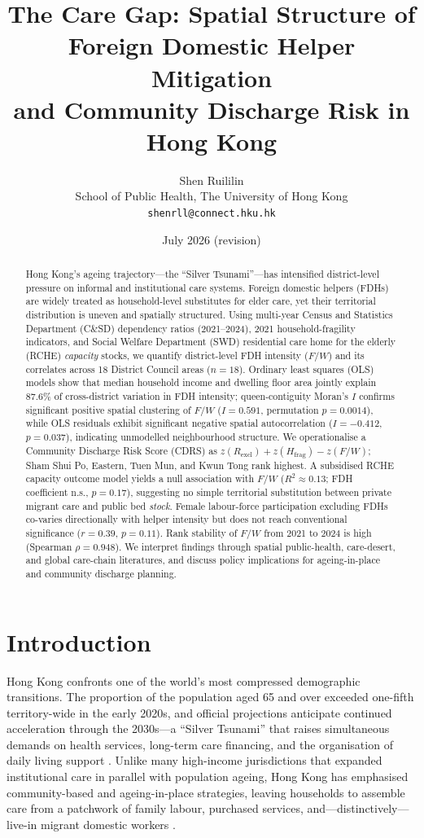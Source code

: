 \documentclass[11pt,a4paper]{article}
\title{The Care Gap: Spatial Structure of Foreign Domestic Helper Mitigation\\
and Community Discharge Risk in Hong Kong}
\author{Shen Ruililin\\
\small School of Public Health, The University of Hong Kong\\
\small \texttt{shenrll@connect.hku.hk}}
\date{July 2026 (revision)}
\begin{document}
\maketitle

\begin{abstract}
Hong Kong's ageing trajectory---the ``Silver Tsunami''---has intensified district-level pressure on informal and institutional care systems. Foreign domestic helpers (FDHs) are widely treated as household-level substitutes for elder care, yet their territorial distribution is uneven and spatially structured. Using multi-year Census and Statistics Department (C\&SD) dependency ratios (2021--2024), 2021 household-fragility indicators, and Social Welfare Department (SWD) residential care home for the elderly (RCHE) \emph{capacity} stocks, we quantify district-level FDH intensity ($F/W$) and its correlates across 18 District Council areas ($n{=}18$). Ordinary least squares (OLS) models show that median household income and dwelling floor area jointly explain 87.6\% of cross-district variation in FDH intensity; queen-contiguity Moran's $I$ confirms significant positive spatial clustering of $F/W$ ($I{=}0.591$, permutation $p{=}0.0014$), while OLS residuals exhibit significant negative spatial autocorrelation ($I{=}{-}0.412$, $p{=}0.037$), indicating unmodelled neighbourhood structure. We operationalise a Community Discharge Risk Score (CDRS) as $z(R_{\mathrm{excl}})+z(H_{\mathrm{frag}})-z(F/W)$; Sham Shui Po, Eastern, Tuen Mun, and Kwun Tong rank highest. A subsidised RCHE capacity outcome model yields a null association with $F/W$ ($R^2{\approx}0.13$; FDH coefficient n.s., $p{=}0.17$), suggesting no simple territorial substitution between private migrant care and public bed \emph{stock}. Female labour-force participation excluding FDHs co-varies directionally with helper intensity but does not reach conventional significance ($r{=}0.39$, $p{=}0.11$). Rank stability of $F/W$ from 2021 to 2024 is high (Spearman $\rho{=}0.948$). We interpret findings through spatial public-health, care-desert, and global care-chain literatures, and discuss policy implications for ageing-in-place and community discharge planning.
\end{abstract}

\section{Introduction}

Hong Kong confronts one of the world's most compressed demographic transitions. The proportion of the population aged 65 and over exceeded one-fifth territory-wide in the early 2020s, and official projections anticipate continued acceleration through the 2030s---a ``Silver Tsunami'' that raises simultaneous demands on health services, long-term care financing, and the organisation of daily living support \citep{phillips2005,census2024}. Unlike many high-income jurisdictions that expanded institutional care in parallel with population ageing, Hong Kong has emphasised community-based and ageing-in-place strategies, leaving households to assemble care from a patchwork of family labour, purchased services, and---distinctively---live-in migrant domestic workers \citep{chui2017}.
\end{document}
